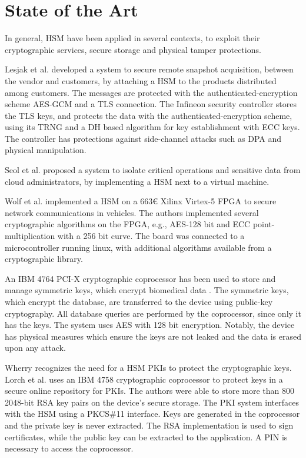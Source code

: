 \section{State of the Art}\label{chap:background:art}

In general, \ac{HSM} have been applied in several contexts, to exploit their cryptographic services, secure storage and physical tamper protections.

Lesjak et al. \cite{iothardware} developed a system to secure remote snapshot acquisition, between the vendor and customers, by attaching a HSM to the products distributed among customers. 
The messages are protected with the authenticated-encryption scheme \ac{AES}-\ac{GCM} and a TLS connection.
The Infineon security controller stores the TLS keys, and protects the data with the authenticated-encryption scheme, using its TRNG and a \ac{DH} based algorithm for key establishment with ECC keys. The controller has protections against side-channel attacks such as \ac{DPA} and physical manipulation.

Seol et al. \cite{trustediaashsm} proposed a system to isolate critical operations and sensitive data from cloud administrators, by implementing a \ac{HSM} next to a virtual machine.

Wolf et al. \cite{wolf2011design} implemented a HSM on a 663€ Xilinx Virtex-5 FPGA to secure network communications in vehicles. The authors implemented several cryptographic algorithms on the FPGA, e.g., AES-128 bit and ECC point-multiplication with a 256 bit curve. The board was connected to a microcontroller running linux, with additional algorithms available from a cryptographic library.

An IBM 4764 PCI-X cryptographic coprocessor has been used to store and manage symmetric keys, which encrypt biomedical data \cite{canim2011biomedical}. The symmetric keys, which encrypt the database, are transferred to the device using public-key cryptography. All database queries are performed by the coprocessor, since only it has the keys. The system uses AES with 128 bit encryption. Notably, the device has physical measures which ensure the keys are not leaked and the data is erased upon any attack.

Wherry \cite{wherry2003secure} recognizes the need for a HSM PKIs to protect the cryptographic keys.
Lorch et al. \cite{lorch2004hardware} uses an IBM 4758 cryptographic coprocessor to protect keys in a secure online repository for PKIs. The authors were able to store more than 800 2048-bit RSA key pairs on the device's secure storage. The PKI system interfaces with the HSM using a PKCS\#11 interface. Keys are generated in the coprocessor and the private key is never extracted. The RSA implementation is used to sign certificates, while the public key can be extracted to the application. A PIN is necessary to access the coprocessor.

